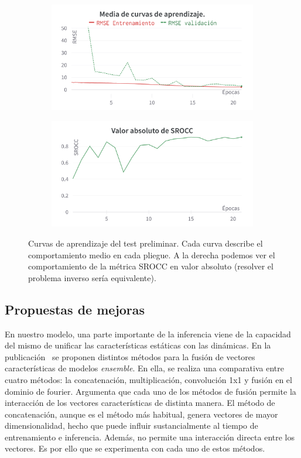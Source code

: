 \begin{figure}[htp]
  \begin{subfigure}[b]{0.49\textwidth}
  \centering
    \includegraphics[width=\textwidth]{imagenes/chapter5/PreTestCurves.png}
  \end{subfigure}
  \begin{subfigure}[b]{0.49\textwidth}
  \centering
    \includegraphics[width=\textwidth]{imagenes/chapter5/PreTestSROCC.png}
  \end{subfigure}
  \caption[Curvas de aprendizaje del test preliminar.]{Curvas de aprendizaje del test preliminar. 
  Cada curva describe el comportamiento medio en cada pliegue. A la derecha 
  podemos ver el comportamiento de la métrica SROCC en valor absoluto 
  (resolver el problema inverso sería equivalente).}
  \label{fig:PreTestCurves}
\end{figure}


\subsection{Propuestas de mejoras}
En nuestro modelo, una parte importante de la inferencia viene de la capacidad del mismo de unificar las características 
estáticas con las dinámicas. En la publicación~\cite{EnsemblePCQA} se proponen distintos métodos para la fusión
de vectores características de modelos \emph{ensemble}.
En ella, se realiza una comparativa entre cuatro métodos: la concatenación, multiplicación, convolución 1x1 y 
fusión en el dominio de fourier. 
Argumenta que cada uno de los métodos de fusión permite la interacción de los vectores 
características de distinta manera. El método de concatenación, aunque es el método 
más habitual, genera vectores de mayor dimensionalidad, hecho que puede influir 
sustancialmente al tiempo de entrenamiento e inferencia. Además, no permite una interacción directa entre los vectores. 
Es por ello que se experimenta con cada uno de estos métodos.  

